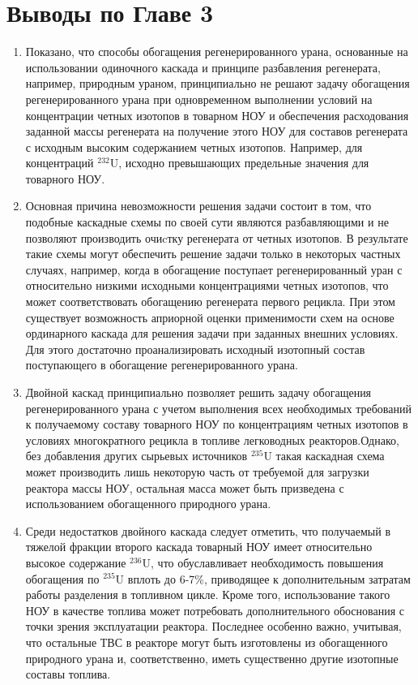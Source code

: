 \section{Выводы по Главе 3}\label{sec:ch3/conclusion}

\begin{enumerate}
  \item Показано, что способы обогащения регенерированного урана, основанные на использовании одиночного каскада и принципе разбавления регенерата, например, природным ураном, принципиально не решают задачу обогащения регенерированного урана при одновременном выполнении условий на концентрации четных изотопов в товарном НОУ и обеспечения расходования заданной массы регенерата на получение этого НОУ для составов регенерата с исходным высоким содержанием четных изотопов. Например, для концентраций $^{232}$U, исходно превышающих предельные значения для товарного НОУ. 
  \item Основная причина невозможности решения задачи состоит в том, что подобные каскадные схемы по своей сути являются разбавляющими и не позволяют производить очиcтку регенерата от четных изотопов. В результате такие схемы могут обеспечить решение задачи только в некоторых частных случаях, например, когда в обогащение поступает регенерированный уран с относительно низкими исходными концентрациями четных изотопов, что может соответствовать обогащению регенерата первого рецикла. При этом существует возможность априорной оценки применимости схем на основе ординарного каскада для решения задачи при заданных внешних условиях. Для этого достаточно проанализировать исходный изотопный состав поступающего в обогащение регенерированного урана.
      \item Двойной каскад принципиально позволяет решить задачу обогащения регенерированного урана с учетом выполнения всех необходимых требований к получаемому составу товарного НОУ по концентрациям четных изотопов в условиях многократного рецикла в топливе легководных реакторов.Однако, без добавления других сырьевых источников $^{235}$U такая каскадная схема может производить лишь некоторую часть от требуемой для загрузки реактора массы НОУ, остальная масса может быть призведена с использованием обогащенного природного урана.
    \item Среди недостатков двойного каскада следует отметить, что получаемый в тяжелой фракции второго каскада товарный НОУ имеет относительно высокое содержание $^{236}$U, что обуславливает необходимость повышения обогащения по $^{235}$U вплоть до 6-7\%, приводящее к дополнительным затратам работы разделения в топливном цикле. Кроме того, использование такого НОУ в качестве топлива может потребовать дополнительного обоснования с точки зрения эксплуатации реактора. Последнее особенно важно, учитывая, что остальные ТВС в реакторе могут быть изготовлены из обогащенного природного урана и, соответственно, иметь существенно другие изотопные составы топлива.

\end{enumerate}
